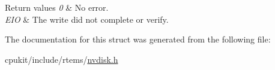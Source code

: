 \begin{DoxyRetVals}{Return values}
{\em 0} & No error. \\
\hline
{\em E\+IO} & The write did not complete or verify. \\
\hline
\end{DoxyRetVals}


The documentation for this struct was generated from the following file\+:\begin{DoxyCompactItemize}
\item 
cpukit/include/rtems/\mbox{\hyperlink{nvdisk_8h}{nvdisk.\+h}}\end{DoxyCompactItemize}
